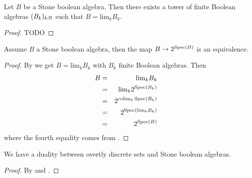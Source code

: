 \begin{lemma}\label{stone-boolean-is-limit-stone-finite}
Let $B$ be a Stone boolean algebra. Then there exists a tower of finite Boolean algebras $(B_k)_{k:\mathbb{N}}$ such that $B=\mathrm{lim}_kB_k$.
\end{lemma}

\begin{proof}
TODO
\end{proof}

\begin{lemma}\label{stone-boolean-inverse}
Assume $B$ a Stone boolean algebra, then the map $B\to 2^{\operatorname{Spec}(B)}$ is an equivalence.
\end{lemma}

\begin{proof}
By  we get $B=\mathrm{lim}_kB_k$ with $B_k$ finite Boolean algebras. Then
\begin{eqnarray}
B &=& \mathrm{lim}_kB_k\nonumber\\
&=& \mathrm{lim}_k2^{\operatorname{Spec}(B_k)}\nonumber\\
&=& 2^{\mathrm{colim}_k\operatorname{Spec}(B_k)}\nonumber\\
&=& 2^{\operatorname{Spec}(\mathrm{lim}_kB_k)} \nonumber\\
&=& 2^{\operatorname{Spec}(B)}\nonumber
\end{eqnarray}
where the fourth equality comes from .
\end{proof}

\begin{theorem}
We have a duality between overtly discrete sets and Stone boolean algebras.
\end{theorem}

\begin{proof}
By  and .
\end{proof}


